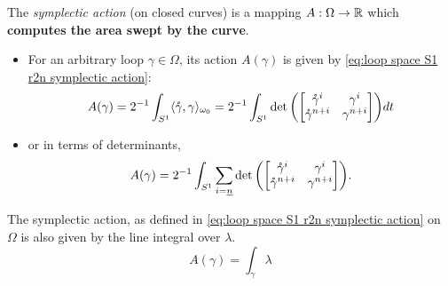 \documentclass[../main-v2-manifolds.tex]{subfiles}
\begin{document}
\begin{definition}\label{def:symplectic action closed curves}
    The \emph{symplectic action} (on closed curves) is a mapping $A:\Omega\to\mathbb{R}$ which \textbf{computes the area swept by the curve}. 
    \begin{itemize}
        \item For an arbitrary loop $\gamma\in\Omega$, its action $A(\gamma)$ is given by \cref{eq:loop space S1 r2n symplectic action}:
        \begin{equation}
            A(\gamma) = 2^{-1}\int_{S^1}\langle\mathring{\gamma},\gamma\rangle_{\omega_0} = 2^{-1}\int_{S^1}\det\qty(\mqty[\mathring{\gamma}^{i} & \gamma^{i}\\ \mathring{\gamma}^{n+i} & \gamma^{n+i}])dt
            \label{eq:loop space S1 r2n symplectic action}
        \end{equation}
        \item or in terms of determinants, 
        \begin{equation}
            A(\gamma) = 2^{-1}\int_{S^1}\sum_{i=\underline{n}}\det\qty(\mqty[\mathring{\gamma}^i & \gamma^i \\ \mathring{\gamma}^{n+i} & \gamma^{n+i}]).
            \label{eq:loop space S1 r2n symplectic action determinant formula}
        \end{equation}
    \end{itemize}
\end{definition}
\begin{lemma}
    The symplectic action, as defined in \cref{eq:loop space S1 r2n symplectic action} on $\Omega$ is also given by the line integral over $\lambda$.
    \begin{equation}
        A(\gamma) = \int_{\gamma}\lambda
        \label{eq:loop space S1 r2n symplectic action lambda}
    \end{equation}
\end{lemma}
\end{document}
